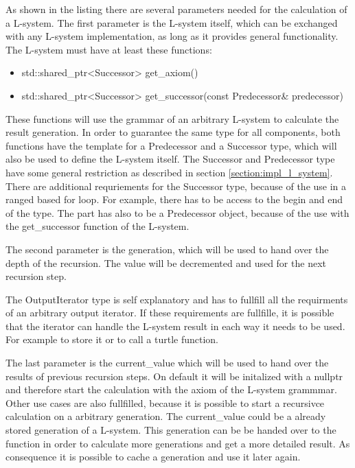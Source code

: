 \documentclass[english]{cpp-hmwk}
\begin{document}
\noindent As shown in the listing there are several parameters needed for the calculation of a  L-system. The first parameter is the L-system itself, which can be exchanged with any L-system implementation, as long as it provides general functionality. The L-system must have at least these functions:

\begin{itemize}
\item std::shared\_ptr<Successor> get\_axiom()
\item std::shared\_ptr<Successor> get\_successor(const Predecessor\& predecessor)
\end{itemize}

\noindent These functions will use the grammar of an arbitrary L-system to calculate the result generation. In order to guarantee the same type for all components, both functions have the template for a Predecessor and a Successor type, which will also be used to define the L-system itself. The Successor and Predecessor type have some general restriction as described in section \ref{section:impl_l_system}.\newline
There are additional requriements for the Successor type, because of the use in a ranged based for loop. For example, there has to be access to the begin and end of the type. The part has also to be a Predecessor object, because of the use with the get\_successor function of the L-system.

The second parameter is the generation, which will be used to hand over the depth of the recursion. The value will be decremented and used for the next recursion step.

The OutputIterator type is self explanatory and has to fullfill all the requirments of an arbitrary output iterator. If these requirements are fullfille, it is possible that the iterator can handle the L-system result in each way it needs to be used. For example to store it or to call a turtle function.

The last parameter is the current\_value which will be used to hand over the results of previous recursion steps. On default it will be initalized with a nullptr and therefore start the calculation with the axiom of the L-system grammmar. Other use cases are also fullfilled, because it is possible to start a recursivce calculation on a arbitrary generation. The current\_value could be a already stored generation of a L-system. This generation can be be handed over to the function in order to calculate more generations and get a more detailed result. As consequence it is possible to cache a generation and use it later again.
\end{document}
